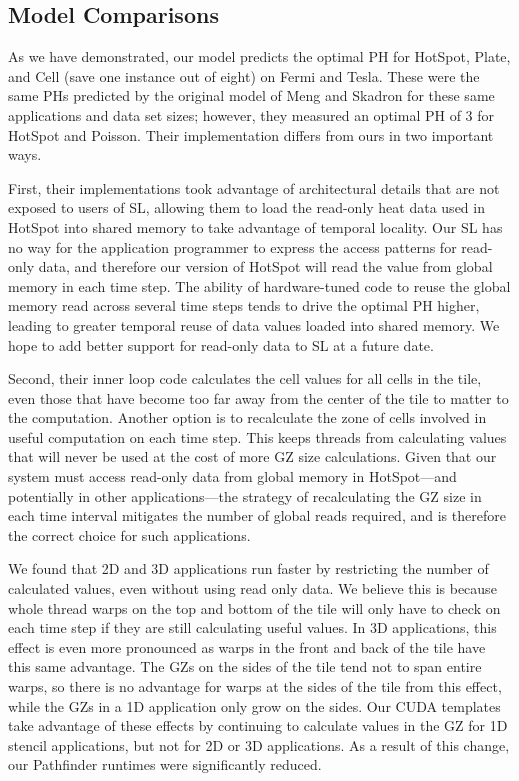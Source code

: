 \documentclass{sig-alternate}
\begin{document}
\subsection{Model Comparisons}
As we have demonstrated, our model predicts the optimal PH for HotSpot,
Plate, and Cell (save one instance out of eight) on Fermi and Tesla.  These
were the same PHs predicted by the original model of Meng and Skadron for
these same applications and data set sizes; however, they measured an optimal
PH of 3 for HotSpot and Poisson.  Their implementation differs from ours in
two important ways.

First, their implementations took advantage of architectural details that are
not exposed to users of SL, allowing them to load the read-only heat data
used in HotSpot into shared memory to take advantage of temporal locality.
Our SL has no way for the application programmer to express the access
patterns for read-only data, and therefore our version of HotSpot will read
the value from global memory in each time step.  The ability of
hardware-tuned code to reuse the global memory read across several time steps
tends to drive the optimal PH higher, leading to greater temporal reuse of
data values loaded into shared memory.  We hope to add better support for
read-only data to SL at a future date.

Second, their inner loop code calculates the cell values for all cells in the
tile, even those that have become too far away from the center of the tile to
matter to the computation.  Another option is to recalculate the zone of
cells involved in useful computation on each time step.  This keeps threads
from calculating values that will never be used at the cost of more GZ size
calculations.  Given that our system must access read-only data from global
memory in HotSpot---and potentially in other applications---the strategy of
recalculating the GZ size in each time interval mitigates the number of
global reads required, and is therefore the correct choice for such
applications.

We found that 2D and 3D applications run faster by restricting the number of
calculated values, even without using read only data. We believe this is
because whole thread warps on the top and bottom of the tile will only have
to check on each time step if they are still calculating useful values.  In
3D applications, this effect is even more pronounced as warps in the front
and back of the tile have this same advantage.  The GZs on the sides of the
tile tend not to span entire warps, so there is no advantage for warps at the
sides of the tile from this effect, while the GZs in a 1D application only
grow on the sides.  Our CUDA templates take advantage of these effects by
continuing to calculate values in the GZ for 1D stencil applications, but not
for 2D or 3D applications.  As a result of this change, our Pathfinder
runtimes were significantly reduced.
\end{document}

